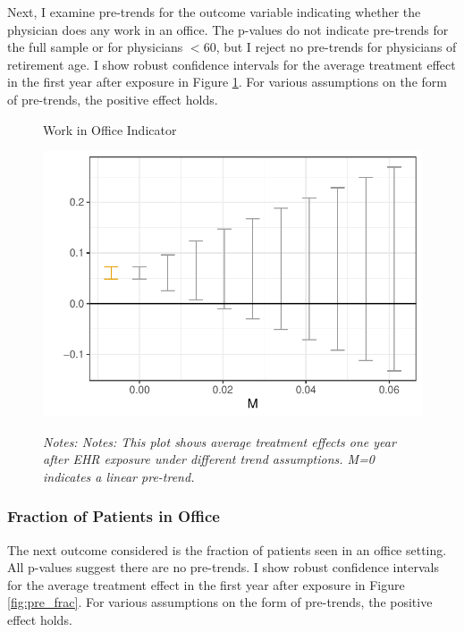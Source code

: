 \documentclass[12pt]{article}
\begin{document}
Next, I examine pre-trends for the outcome variable indicating whether the physician does any work in an office. The p-values do not indicate pre-trends for the full sample or for physicians $< 60$, but I reject no pre-trends for physicians of retirement age. I show robust confidence intervals for the average treatment effect in the first year after exposure in Figure \ref{fig:pre_work}. For various assumptions on the form of pre-trends, the positive effect holds.

\begin{figure}[ht]
    \centering
    \captionsetup{width=.5\linewidth}
    \caption{Work in Office Indicator}
    \includegraphics[scale=.5]{Objects/office_ind_pretrends_plot.pdf}
    \label{fig:pre_work}
    \vspace{2mm}
    \caption*{\footnotesize{\textit{Notes: Notes: This plot shows average treatment effects one year after EHR exposure under different trend assumptions. M=0 indicates a linear pre-trend.}}}
\end{figure}

\subsubsection{Fraction of Patients in Office}

The next outcome considered is the fraction of patients seen in an office setting. All p-values suggest there are no pre-trends. I show robust confidence intervals for the average treatment effect in the first year after exposure in Figure \ref{fig:pre_frac}. For various assumptions on the form of pre-trends, the positive effect holds.
\end{document}
